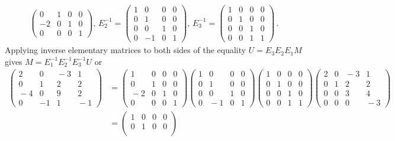 \begin{example}
\begin{gather*}
\begin{pmatrix}
0&1&0&0\\
-2&0&1&0\\
0&0&0&1
\end{pmatrix}  , \,
E_2^{-1}=
\begin{pmatrix}
1&0&0&0\\
0&1&0&0\\
0&0&1&0\\
0&-1&0&1
\end{pmatrix}  , \,
E_3^{-1}=
\begin{pmatrix}
1&0&0&0\\
0&1&0&0\\
0&0&1&0\\
0&0&1&1
\end{pmatrix} \, .
\end{gather*}
Applying inverse elementary matrices to both sides of the equality  $U=E_3E_2E_1M$ gives 
$M=E_1^{-1}E_2^{-1}E_3^{-1}U$ or 
\begin{align*}
\begin{pmatrix}
2&0&\!\!-3&1\\
0&1&2&2\\
\!-4&0&9&2\\
0&-1&1&\!\!-1
\end{pmatrix}
&=
\begin{pmatrix}
1&0&0&0\\
0&1&0&0\\
\!-2&0&1&0\\
0&0&0&1
\end{pmatrix} \!\!\!
\begin{pmatrix}
1&0&0&0\\
0&1&0&0\\
0&0&1&0\\
0&\!\!\!-1&0&1
\end{pmatrix}\!\!\!
\begin{pmatrix}
1&0&0&0\\
0&1&0&0\\
0&0&1&0\\
0&0&1&1
\end{pmatrix}\!\!\!
\begin{pmatrix}
2&0&\!\!\!-3&1\\
0&1&2&2\\
0&0&3&4\\
0&0&0&\!\!-3
\end{pmatrix}
\\[2mm]
&=
\begin{pmatrix}
1&0&0&0\\
0&1&0&0\\

\end{pmatrix}
\end{align*}
\end{example}
